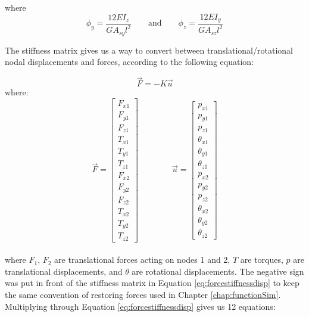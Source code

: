 { where
\[ \phi_y = \dfrac{12EI_z}{GA_{sy}l^2} \qquad  \textrm{and} \qquad \phi_z = \dfrac{12EI_y}{GA_{sz}l^2} \]


The stiffness matrix gives us a way to convert between translational/rotational nodal displacements and forces, according to the following equation:

 \begin{equation} \label{eq:forcestiffnessdisp} \vec{F} = -K\vec{u} \end{equation}
where:
\[ \vec{F} =  \left[ \begin{array}{ccc}
F_{x1}\\
F_{y1}\\
F_{z1}\\
T_{x1}\\
T_{y1}\\
T_{z1}\\
F_{x2}\\
F_{y2}\\
F_{z2}\\
T_{x2}\\
T_{y2}\\
T_{z2}
 \end{array} \right]  \qquad \qquad  
 \vec{u} =  \left[ \begin{array}{ccc}
p_{x1}\\
p_{y1}\\
p_{z1}\\
\theta_{x1}\\
\theta_{y1}\\
\theta_{z1}\\
p_{x2}\\
p_{y2}\\
p_{z2}\\
\theta_{x2}\\
\theta_{y2}\\
\theta_{z2}
 \end{array} \right]
 \]\\
 
where $F_1$, $F_2$ are translational forces acting on nodes 1 and 2, $T$ are torques, $p$ are translational displacements, and $\theta$ are rotational displacements.  The negative sign was put in front of the stiffness matrix in Equation \ref{eq:forcestiffnessdisp} to keep the same convention of restoring forces used in Chapter \ref{chap:functionSim}.\\

Multiplying through Equation \ref{eq:forcestiffnessdisp} gives us 12 equations:

}
